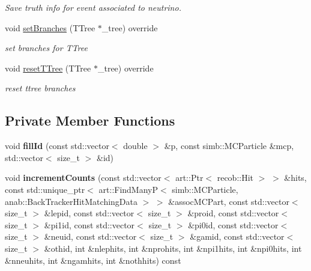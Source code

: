 \begin{DoxyCompactItemize}
\begin{DoxyCompactList}\small\item\em Save truth info for event associated to neutrino. \end{DoxyCompactList}\item 
\hypertarget{classanalysis_1_1SlicePurCompl_ae7e1131785f819a530a573c6b20d1cbc}{void \hyperlink{classanalysis_1_1SlicePurCompl_ae7e1131785f819a530a573c6b20d1cbc}{set\-Branches} (T\-Tree $\ast$\-\_\-tree) override}\label{classanalysis_1_1SlicePurCompl_ae7e1131785f819a530a573c6b20d1cbc}

\begin{DoxyCompactList}\small\item\em set branches for T\-Tree \end{DoxyCompactList}\item 
\hypertarget{classanalysis_1_1SlicePurCompl_a43bf5b44e619f2dc3e5d00098048471b}{void \hyperlink{classanalysis_1_1SlicePurCompl_a43bf5b44e619f2dc3e5d00098048471b}{reset\-T\-Tree} (T\-Tree $\ast$\-\_\-tree) override}\label{classanalysis_1_1SlicePurCompl_a43bf5b44e619f2dc3e5d00098048471b}

\begin{DoxyCompactList}\small\item\em reset ttree branches \end{DoxyCompactList}\end{DoxyCompactItemize}
\subsection*{Private Member Functions}
\begin{DoxyCompactItemize}
\item 
\hypertarget{classanalysis_1_1SlicePurCompl_a1cab4a3ebdd3aae05b22ad5d06a6ce1b}{void {\bfseries fill\-Id} (const std\-::vector$<$ double $>$ \&p, const simb\-::\-M\-C\-Particle \&mcp, std\-::vector$<$ size\-\_\-t $>$ \&id)}\label{classanalysis_1_1SlicePurCompl_a1cab4a3ebdd3aae05b22ad5d06a6ce1b}

\item 
\hypertarget{classanalysis_1_1SlicePurCompl_a3ae6a4a95f5d387edd47f3646bc39c70}{void {\bfseries increment\-Counts} (const std\-::vector$<$ art\-::\-Ptr$<$ recob\-::\-Hit $>$ $>$ \&hits, const std\-::unique\-\_\-ptr$<$ art\-::\-Find\-Many\-P$<$ simb\-::\-M\-C\-Particle, anab\-::\-Back\-Tracker\-Hit\-Matching\-Data $>$ $>$ \&assoc\-M\-C\-Part, const std\-::vector$<$ size\-\_\-t $>$ \&lepid, const std\-::vector$<$ size\-\_\-t $>$ \&proid, const std\-::vector$<$ size\-\_\-t $>$ \&pi1id, const std\-::vector$<$ size\-\_\-t $>$ \&pi0id, const std\-::vector$<$ size\-\_\-t $>$ \&neuid, const std\-::vector$<$ size\-\_\-t $>$ \&gamid, const std\-::vector$<$ size\-\_\-t $>$ \&othid, int \&nlephits, int \&nprohits, int \&npi1hits, int \&npi0hits, int \&nneuhits, int \&ngamhits, int \&nothhits) const }\label{classanalysis_1_1SlicePurCompl_a3ae6a4a95f5d387edd47f3646bc39c70}

\end{DoxyCompactItemize}
